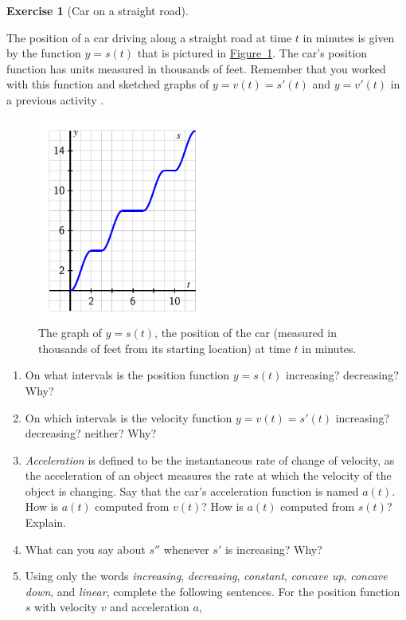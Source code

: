 \documentclass[10pt,]{book}
\theoremstyle{plain}
\theoremstyle{definition}
\theoremstyle{definition}
\theoremstyle{definition}
\newtheorem{exercise}[theorem]{Exercise}
\begin{document}
\begin{exercise}[Car on a straight road]\label{act-car-concavity}

				The position of a car driving along a straight road at time \(t\) in minutes is given by the function \(y = s(t)\) that is pictured in \hyperref[act-car-graph]{Figure~\ref{act-car-graph}}. The car's position function has units measured in thousands of feet. Remember that you worked with this function and sketched graphs of \(y = v(t) = s'(t)\) and \(y = v'(t)\) in a previous activity . %
\leavevmode%
\begin{figure}
\centering
\includegraphics[width=0.50\textwidth,]{images/act-car-graph.pdf}\caption{The graph of \(y = s(t)\), the position of the car (measured in thousands of feet from its starting location) at time \(t\) in minutes.\label{act-car-graph}}
\end{figure}
\leavevmode%
\begin{enumerate}
\item\hypertarget{li-5}{}On what intervals is the position function \(y = s(t)\) increasing? decreasing?  Why?\item\hypertarget{li-6}{}On which intervals is the velocity function \(y = v(t) = s'(t)\) increasing? decreasing? neither?  Why?\item\hypertarget{li-7}{}\emph{Acceleration} is defined to be the instantaneous rate of change of velocity, as the acceleration of an object measures the rate at which the velocity of the object is changing.  Say that the car's acceleration function is named \(a(t)\).  How is \(a(t)\) computed from \(v(t)\)?  How is \(a(t)\) computed from \(s(t)\)?  Explain.\item\hypertarget{li-8}{}What can you say about \(s''\) whenever \(s'\) is increasing?  Why?\item\hypertarget{li-9}{}Using only the words \emph{increasing}, \emph{decreasing}, \emph{constant}, \emph{concave up}, \emph{concave down}, and \emph{linear}, complete the following sentences.  For the position function \(s\) with velocity \(v\) and acceleration \(a\),

\end{enumerate}
\end{exercise}
\end{document}
